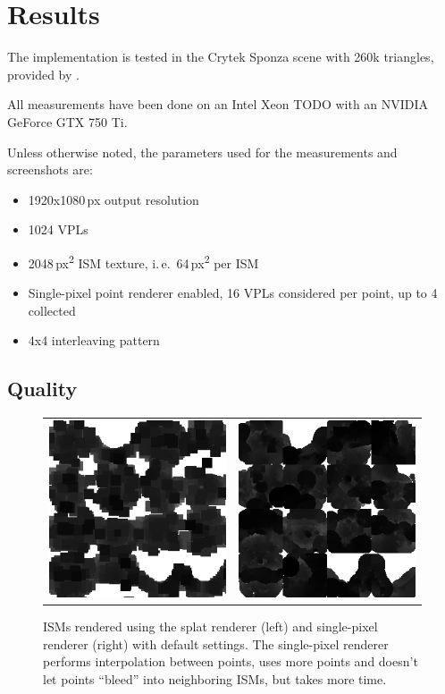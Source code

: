  \section{Results}


 The implementation is tested in the Crytek Sponza scene with 260k triangles, provided by \cite{McGuire2011Data}.

 All measurements have been done on an Intel Xeon TODO with an NVIDIA GeForce GTX 750 Ti.


 Unless otherwise noted, the parameters used for the measurements and screenshots are:
 \vspace{-1em}
 \begin{itemize}
     \setlength\itemsep{0.0em}
     \item 1920x1080\,px output resolution
     \item 1024 VPLs
     \item 2048\,px\textsuperscript{2} ISM texture, i.\,e.\ 64\,px\textsuperscript{2} per ISM
     \item Single-pixel point renderer enabled, 16 VPLs considered per point, up to 4 collected
     \item 4x4 interleaving pattern
 \end{itemize}




 \subsection{Quality}

 \begin{figure}[htb]
 \centering
   \begin{tabular}{@{}cc@{}}
     \includegraphics[width=.22\textwidth]{../screenshots/ism_splat_cropped} &
     \includegraphics[width=.22\textwidth]{../screenshots/ism_single_pixel_cropped}
   \end{tabular}
   \caption{ISMs rendered using the splat renderer (left) and single-pixel renderer (right) with default settings. The single-pixel renderer performs interpolation between points, uses more points and doesn't let points ``bleed'' into neighboring ISMs, but takes more time.}
   \label{fig:results:isms}
 \end{figure}


